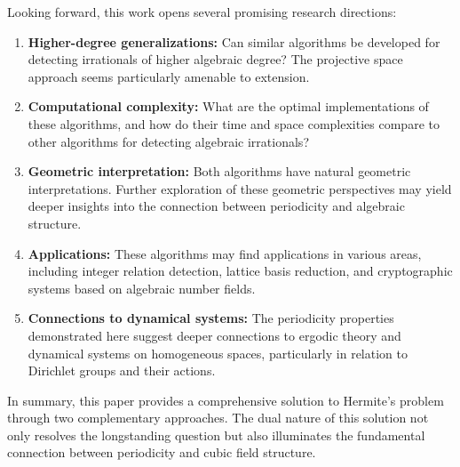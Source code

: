 Looking forward, this work opens several promising research directions:

\begin{enumerate}
    \item \textbf{Higher-degree generalizations:} Can similar algorithms be developed for detecting irrationals of higher algebraic degree? The projective space approach seems particularly amenable to extension.
    
    \item \textbf{Computational complexity:} What are the optimal implementations of these algorithms, and how do their time and space complexities compare to other algorithms for detecting algebraic irrationals?
    
    \item \textbf{Geometric interpretation:} Both algorithms have natural geometric interpretations. Further exploration of these geometric perspectives may yield deeper insights into the connection between periodicity and algebraic structure.
    
    \item \textbf{Applications:} These algorithms may find applications in various areas, including integer relation detection, lattice basis reduction, and cryptographic systems based on algebraic number fields.
    
    \item \textbf{Connections to dynamical systems:} The periodicity properties demonstrated here suggest deeper connections to ergodic theory and dynamical systems on homogeneous spaces, particularly in relation to Dirichlet groups and their actions.
\end{enumerate}

In summary, this paper provides a comprehensive solution to Hermite's problem through two complementary approaches. The dual nature of this solution not only resolves the longstanding question but also illuminates the fundamental connection between periodicity and cubic field structure.
